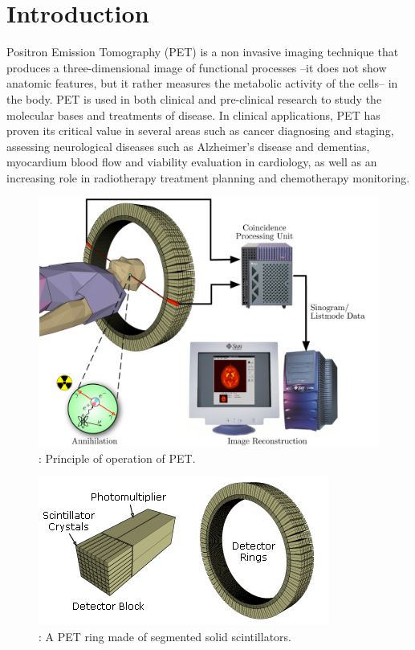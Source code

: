 \documentclass[review]{elsarticle}
\begin{document}


\section{Introduction}

Positron Emission Tomography (PET) is a non invasive imaging technique that produces a three-dimensional image of functional processes --it does not show anatomic features, but it rather  measures the metabolic activity of the cells-- in the body. PET is used in
both clinical and pre-clinical research to study the molecular bases and treatments of
disease. In clinical applications, PET has proven its critical value in several areas such as
cancer diagnosing and staging, assessing neurological diseases such as Alzheimer's disease
and dementias, myocardium blood flow and viability evaluation in cardiology, as well as an
increasing role in radiotherapy treatment planning and chemotherapy monitoring. 

\begin{figure}[!htb]
	\centering
	\includegraphics[scale=0.175]{../img/PET-schema.png}
	\caption{\label{fig.pet}: Principle of operation of PET. }
\end{figure}

\begin{figure}[!htb]
	\centering
	\includegraphics[scale=0.6]{../img/PET-detectorsystem_2.png}
	\caption{\label{fig.det}: A PET ring made of segmented solid scintillators. }
\end{figure}
\end{document}
